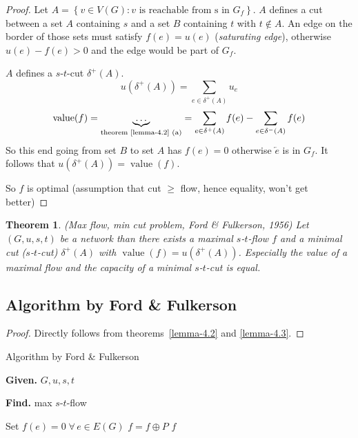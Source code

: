 \documentclass{article}
\newtheorem{theorem}{Theorem}
\newcommand{\set}[1]{\left\{#1\right\}}
\newcommand{\given}[1]{\textbf{Given.} #1\par}
\newcommand{\find}[1]{\textbf{Find.} #1\par}
\newcommand{\gath}[2]{$#1$-$#2$-path} %
\newcommand{\flow}[2]{$#1$-$#2$-flow}
\newcommand{\fall}{\;\forall\,}
\begin{document}
\begin{proof}
  Let $A = \set{v \in V(G): v \text{ is reachable from s in } G_f}$.
  $A$ defines a cut between a set $A$ containing $s$ and a set $B$ containing $t$ with $t \notin A$.
  An edge on the border of those sets must satisfy $f(e) = u(e)$ (\emph{saturating edge}),
  otherwise $u(e) - f(e) > 0$ and the edge would be part of $G_f$.

  $A$ defines a $s$-$t$-cut $\delta^+(A)$.
  \[
    u(\delta^+(A)) = \sum_{e \in \delta^+(A)} u_e
  \] \[
    \operatorname{value}(f) = \underbrace{\dots}_{\text{theorem~\ref{lemma-4.2} (a)}}
      = \sum_{e \in \delta^+(A)} f(e) - \sum_{e \in \delta^-(A)} f(e)
  \]
  So this end going from set $B$ to set $A$ has $f(e) = 0$ otherwise
  $\overleftarrow{e}$ is in $G_f$. It follows that $u(\delta^+(A)) = \operatorname{value}(f)$.

  So $f$ is optimal (assumption that cut $\geq$ flow, hence equality, won't get better)
\end{proof}

\begin{theorem} \label{satz-4.4}
  (\emph{Max flow, min cut problem}, Ford \& Fulkerson, 1956)
  Let $(G, u, s, t)$ be a network than there exists a maximal \flow st $f$
  and a minimal cut ($s$-$t$-cut) $\delta^+(A)$ with $\operatorname{value}(f) = u(\delta^+(A))$.
  Especially the value of a maximal flow and the capacity of a minimal $s$-$t$-cut is equal.
\end{theorem}

\subsection{Algorithm by Ford \& Fulkerson}

\begin{proof}
  Directly follows from theorems~\ref{lemma-4.2} and \ref{lemma-4.3}.
\end{proof}

\begin{algorithm}
  \caption{Algorithm by Ford \& Fulkerson}
  \label{fnf-algo}
  \given{$G, u, s, t$}
  \find{max \flow st}
\begin{algorithmic}[1]
  \State Set $f(e) = 0 \fall e \in E(G)$
  \While{$\exists$ \gath st $P$ in $G_f$}
    \State $f = f \oplus P$
  \EndWhile
  \State \Return $f$
\end{algorithmic}
\end{algorithm}
\end{document}

